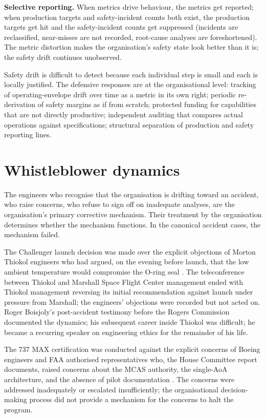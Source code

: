 \textbf{Selective reporting.} When metrics drive behaviour, the metrics get reported; when production targets and safety-incident counts both exist, the production targets get hit and the safety-incident counts get suppressed (incidents are reclassified, near-misses are not recorded, root-cause analyses are foreshortened). The metric distortion makes the organisation's safety state look better than it is; the safety drift continues unobserved.

Safety drift is difficult to detect because each individual step is small and each is locally justified. The defensive responses are at the organisational level: tracking of operating-envelope drift over time as a metric in its own right; periodic re-derivation of safety margins as if from scratch; protected funding for capabilities that are not directly productive; independent auditing that compares actual operations against specifications; structural separation of production and safety reporting lines.

\section{Whistleblower dynamics}

The engineers who recognise that the organisation is drifting toward an accident, who raise concerns, who refuse to sign off on inadequate analyses, are the organisation's primary corrective mechanism. Their treatment by the organisation determines whether the mechanism functions. In the canonical accident cases, the mechanism failed.

The Challenger launch decision was made over the explicit objections of Morton Thiokol engineers who had argued, on the evening before launch, that the low ambient temperature would compromise the O-ring seal \cite{acc:nasa-challenger,hist:vaughan1996}. The teleconference between Thiokol and Marshall Space Flight Center management ended with Thiokol management reversing its initial recommendation against launch under pressure from Marshall; the engineers' objections were recorded but not acted on. Roger Boisjoly's post-accident testimony before the Rogers Commission documented the dynamics; his subsequent career inside Thiokol was difficult; he became a recurring speaker on engineering ethics for the remainder of his life.

The 737 MAX certification was conducted against the explicit concerns of Boeing engineers and FAA authorised representatives who, the House Committee report documents, raised concerns about the MCAS authority, the single-AoA architecture, and the absence of pilot documentation \cite{acc:house-737max-2020}. The concerns were addressed inadequately or escalated insufficiently; the organisational decision-making process did not provide a mechanism for the concerns to halt the program.

